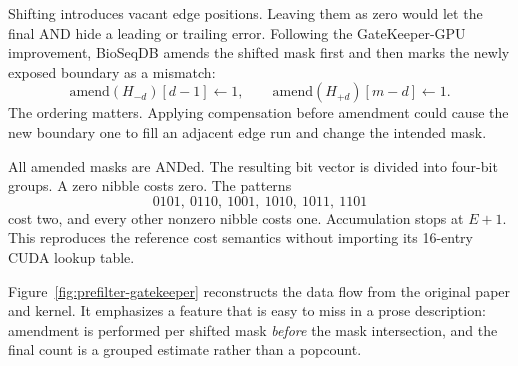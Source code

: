 Shifting introduces vacant edge positions.  Leaving them as zero would let the
final AND hide a leading or trailing error.  Following the GateKeeper-GPU
improvement, BioSeqDB amends the shifted mask first and then marks the newly
exposed boundary as a mismatch:
\[
 \mathrm{amend}(H_{-d})[d-1]\gets1,\qquad
 \mathrm{amend}(H_{+d})[m-d]\gets1.
\]
The ordering matters.  Applying compensation before amendment could cause the
new boundary one to fill an adjacent edge run and change the intended mask.

All amended masks are ANDed.  The resulting bit vector is divided into
four-bit groups.  A zero nibble costs zero.  The patterns
\[
 0101,\ 0110,\ 1001,\ 1010,\ 1011,\ 1101
\]
cost two, and every other nonzero nibble costs one.  Accumulation stops at
\(E+1\).  This reproduces the reference cost semantics without importing its
16-entry CUDA lookup table.

Figure~\ref{fig:prefilter-gatekeeper} reconstructs the data flow from the
original paper and kernel.  It emphasizes a feature that is easy to miss in a
prose description: amendment is performed per shifted mask \emph{before} the
mask intersection, and the final count is a grouped estimate rather than a
popcount.

